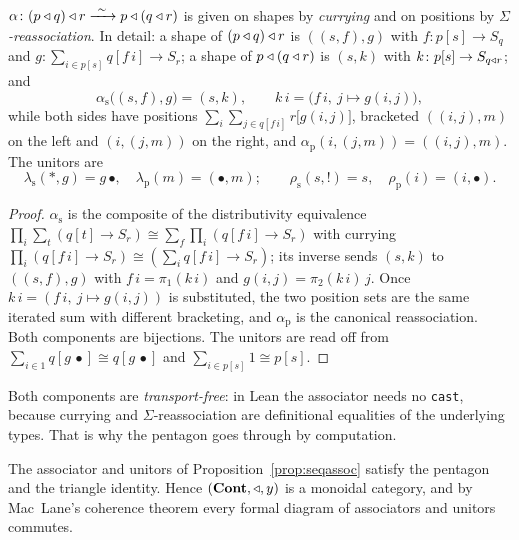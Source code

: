 \begin{Proposition}\label{prop:seqassoc}
$\alpha\colon (p\mathbin{\triangleleft} q)\mathbin{\triangleleft} r\xrightarrow{\ \sim\ } p\mathbin{\triangleleft}(q\mathbin{\triangleleft} r)$ is given on
shapes by \emph{currying} and on positions by \emph{$\Sigma$-reassociation}. In
detail: a shape of $(p\mathbin{\triangleleft} q)\mathbin{\triangleleft} r$ is $((s,f),g)$ with $f\colon p[s]\to S_q$
and $g\colon\sum_{i\in p[s]}q[f\,i]\to S_r$; a shape of $p\mathbin{\triangleleft}(q\mathbin{\triangleleft} r)$ is
$(s,k)$ with $k\colon p[s]\to S_{q\mathbin{\triangleleft} r}$; and
\[
  \alpha_{\mathrm s}\bigl((s,f),g\bigr)=(s,k),\qquad
  k\,i=\bigl(f\,i,\ j\mapsto g(i,j)\bigr),
\]
while both sides have positions $\sum_i\sum_{j\in q[f\,i]} r\bigl[g(i,j)\bigr]$,
bracketed $((i,j),m)$ on the left and $(i,(j,m))$ on the right, and
$\alpha_{\mathrm p}(i,(j,m))=((i,j),m)$. The unitors are
\[
  \lambda_{\mathrm s}(\ast,g)=g\,\bullet,\quad \lambda_{\mathrm p}(m)=(\bullet,m);
  \qquad
  \rho_{\mathrm s}(s,!)=s,\quad \rho_{\mathrm p}(i)=(i,\bullet).
\]
\end{Proposition}

\begin{proof}
$\alpha_{\mathrm s}$ is the composite of the distributivity equivalence
$\prod_i\sum_{t}(q[t]\to S_r)\cong\sum_f\prod_i(q[f\,i]\to S_r)$ with currying
$\prod_i(q[f\,i]\to S_r)\cong(\sum_i q[f\,i]\to S_r)$; its inverse sends $(s,k)$
to $((s,f),g)$ with $f\,i=\pi_1(k\,i)$ and $g(i,j)=\pi_2(k\,i)\,j$. Once
$k\,i=(f\,i,\ j\mapsto g(i,j))$ is substituted, the two position sets are the
same iterated sum with different bracketing, and $\alpha_{\mathrm p}$ is the
canonical reassociation. Both components are bijections. The unitors are read
off from $\sum_{i\in 1}q[g\,\bullet]\cong q[g\,\bullet]$ and
$\sum_{i\in p[s]}1\cong p[s]$.
\end{proof}

Both components are \emph{transport-free}: in Lean the associator needs no
\texttt{cast}, because currying and $\Sigma$-reassociation are definitional
equalities of the underlying types. That is why the pentagon goes through by
computation.

\begin{Theorem}\label{thm:pentagon}
The associator and unitors of Proposition~\ref{prop:seqassoc} satisfy the
pentagon and the triangle identity. Hence $(\mathbf{Cont},\mathbin{\triangleleft},y)$ is a monoidal
category, and by Mac~Lane's coherence theorem \cite{MacLane} every formal diagram of
associators and unitors commutes.
\end{Theorem}

